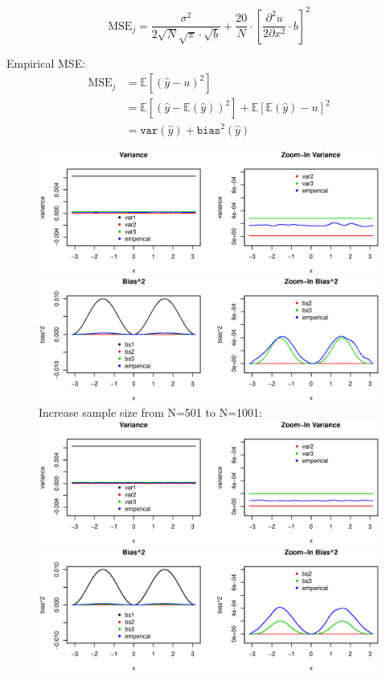 \documentclass{article}
\begin{document}
\begin{itemize}
\begin{equation}
         \text{MSE}_j=  \frac{\sigma^2}{2\sqrt{N}\sqrt{\pi} \cdot \sqrt{b}}  + \frac{20}{N}\cdot\left[\frac{\partial^2 u}{2\partial x^2}\cdot b \right]^2
\end{equation}


Empirical MSE:
\begin{align*}
         \text{MSE}_j&=  \mathbb{E}[(\hat{y} - u)^2]\\
         &= \mathbb{E}[(\hat{y} - \mathbb{E}(\hat{y}))^2] + \mathbb{E}[\mathbb{E} (\hat{y}) -u]^2\\ 
          &= \texttt{var}(\hat{y}) + \texttt{bias}^2(\hat{y})
\end{align*}



\begin{figure}[H]
\includegraphics[width=\linewidth]{pic/sim.mse.eps}
\includegraphics[width=\linewidth]{pic/sim.mse2.eps}
Increase sample size from N=501 to N=1001:\\
\includegraphics[width=\linewidth]{pic/sim.mse3.eps}
\includegraphics[width=\linewidth]{pic/sim.mse4.eps}
\end{figure}


\end{itemize}
\end{document}

